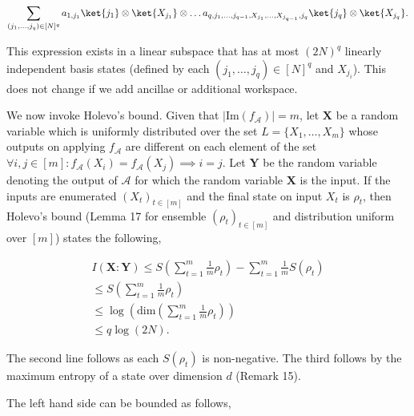 \[\begin{gathered}
\sum_{(j_{1},\ldots,j_{q})\in[N]^{q}}a_{1,j_{1}}\ket{j_{1}}\otimes\ket{X_{j_{1}}}\otimes\ldots a_{q,j_{1},\ldots,j_{q-1},X_{j_{1}},\ldots,X_{j_{q-1}},j_{q}}\ket{j_{q}}\otimes\ket{X_{j_{q}}}.
\end{gathered}\]




This expression exists in a linear subspace that has at most $(2N)^{q}$ linearly independent basis states (defined by each $(j_{1},\ldots,j_{q})\in[N]^{q}$ and $X_{j_{i}}$). This does not change if we add ancillae or additional workspace.\par




We now invoke Holevo’s bound. Given that $|\mathrm{Im}(f_{\mathcal{A}})|=m$,
let $\mathbf{X}$ be a random variable which is uniformly distributed over the set $L=\{X_{1},\ldots,X_{m}\}$
whose outputs on applying $f_{\mathcal{A}}$ are different on each element of the set $\forall i,j\in[m]:f_{\mathcal{A}}(X_{i})=f_{\mathcal{A}}(X_{j})\implies i=j$. Let $\mathbf{Y}$ be the random variable denoting the output of $\mathcal{A}$ for which the random variable $\mathbf{X}$ is the input. If the inputs are enumerated $(X_{t})_{t\in[m]}$ and the final state on input $X_{t}$ is $\rho_{t}$, then Holevo’s bound (Lemma 17 for ensemble $(\rho_{t})_{t\in[m]}$ and distribution uniform over $[m]$) states the following,\par




\[\begin{gathered}
\displaystyle I(\mathbf{X}:\mathbf{Y}) \displaystyle\leq S\left(\sum_{t=1}^{m}\frac{1}{m}\rho_{t}\right)-\sum_{t=1}^{m}\frac{1}{m}S(\rho_{t}) \\
\displaystyle\leq S\left(\sum_{t=1}^{m}\frac{1}{m}\rho_{t}\right) \\
\displaystyle\leq\log\left(\text{dim}\left(\sum_{t=1}^{m}\frac{1}{m}\rho_{t}\right)\right) \\
\displaystyle\leq q\log(2N).
\end{gathered}\]




The second line follows as each $S(\rho_{t})$ is non-negative. The third follows by the maximum entropy of a state over dimension $d$ (Remark 15).\par




The left hand side can be bounded as follows,\par


